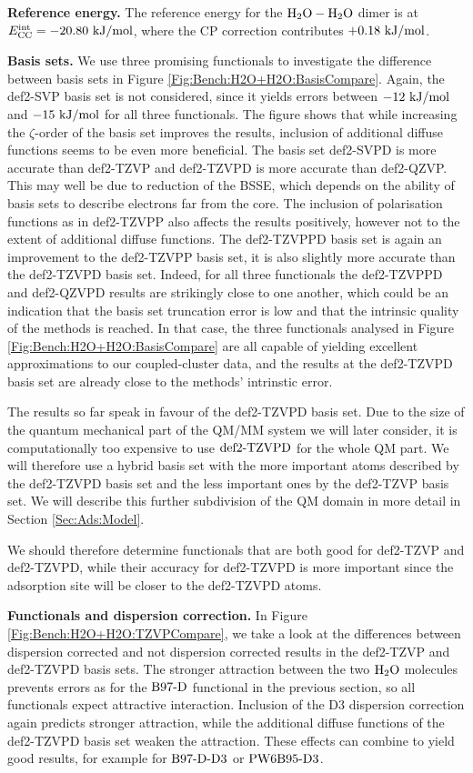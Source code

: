 \documentclass[8.5pt,twoside,twocolumn]{article}
\newcommand\kmo{\enmat{\te {kJ/mol}}}
\theoremstyle{standard}
\begin{document}
\textbf{Reference energy.} The reference energy for the $\mbox{\ensuremath{\text H _2 \text O-\text H _2 \text O}}$ dimer is at
\mbox{$\ecc=-20.80\ \kmo$}, where the CP correction contributes $+0.18\ \kmo$.

\textbf{Basis sets.} We use three promising functionals to investigate the difference
between basis sets in Figure \ref{Fig:Bench:H2O+H2O:BasisCompare}. Again, the
def2-SVP basis set is not considered, since it yields errors between $-12\ \kmo$ and $-15\ \kmo$ for all three
functionals. The figure shows that while increasing the $\zeta$-order of the basis set
improves the results, inclusion of additional diffuse functions seems to
be even more beneficial. The basis set def2-SVPD is more accurate than def2-TZVP and
def2-TZVPD is more accurate than def2-QZVP.
This may well be due to reduction of the BSSE, which depends on the ability
of basis sets to describe electrons far from the core.
The inclusion of polarisation functions as in def2-TZVPP also
affects the results positively, however not to the extent of additional
diffuse functions. The def2-TZVPPD basis set is again an improvement
to the def2-TZVPP basis set, it is also slightly more accurate than the
def2-TZVPD basis set. Indeed, for all three functionals the def2-TZVPPD and
def2-QZVPD results are strikingly close to one another, which could
be an indication that the basis set truncation error is low and that
the intrinsic quality of the methods is reached. In that case, the
three functionals analysed in Figure \ref{Fig:Bench:H2O+H2O:BasisCompare} are
all capable of yielding excellent approximations to our coupled-cluster data,
and the results at the def2-TZVPD basis set are already close to the
methods' intrinstic error.  

The results so far speak in favour of the def2-TZVPD basis set. Due 
to the size of the quantum mechanical part of the QM/MM system we will later consider,
it is computationally too expensive to use $\text{def2-TZVPD}$ for the whole
QM part. We will therefore use a hybrid basis set with the more important atoms
described by the def2-TZVPD basis set and the less important ones by the
def2-TZVP basis set. We will describe this further subdivision of the QM domain
in more detail in Section \ref{Sec:Ads:Model}.

We should therefore determine functionals that are both good for def2-TZVP and def2-TZVPD,
while their accuracy for def2-TZVPD is more important since the adsorption site will
be closer to the def2-TZVPD atoms. 

\textbf{Functionals and dispersion correction.} In Figure
\ref{Fig:Bench:H2O+H2O:TZVPCompare}, we take a look at the differences between dispersion corrected and not dispersion
corrected results in the def2-TZVP and def2-TZVPD basis sets. The stronger
attraction between the two $\text H _2 \text O$ molecules prevents errors as for the
$\text{B97-D}$ functional in the previous section, so all functionals expect attractive
interaction. Inclusion of the D3 dispersion correction again predicts
stronger attraction, while the additional diffuse functions of the def2-TZVPD
basis set weaken the attraction. These effects can combine to yield good
results, for example for $\text{B97-D}\text{-D3}$ or $\text{PW6B95}\text{-D3}$.
\end{document}
